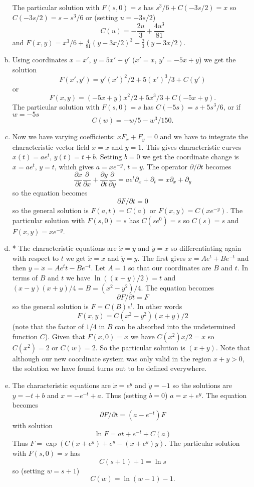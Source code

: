 \documentclass[12pt]{article}
\begin{document}
\begin{answer}
\begin{enumerate}[(a)]
The particular solution with $F(s,0)=s$ has $s^3/6+C(-3s/2)=x$ so $C(-3s/2)=s-s^3/6$ or (setting $u=-3s/2$)
\[C(u)=-\frac{2u}{3}+\frac{4u^3}{81}\]
and $F(x,y)=x^3/6+\frac{4}{81}(y-3x/2)^3-\frac{2}{3}(y-3x/2)$.
\item Using coordinates $x=x'$, $y=5x'+y'$ ($x'=x$, $y'=-5x+y$) we get the solution
\[F(x',y')=y'(x')^2/2+5(x')^3/3+C(y')\]
or
\[F(x,y)=(-5x+y)x^2/2+5x^3/3+C(-5x+y).\]
The particular solution with $F(s,0)=s$ has $C(-5s)=s+5s^3/6$, or if $w=-5s$
\[C(w)=-w/5-w^3/150.\]
\item Now we have varying coefficients: $xF_x+F_y=0$ and we have to integrate the characteristic vector field $\dot{x}=x$ and $\dot{y}=1$. This gives characteristic curves $x(t)=ae^t$, $y(t)=t+b$. Setting $b=0$ we get the coordinate change is $x=ae^t$, $y=t$, which gives $a=xe^{-y}$, $t=y$. The operator $\partial/\partial t$ becomes
\[\frac{\partial x}{\partial t}\frac{\partial}{\partial x}+\frac{\partial y}{\partial t}\frac{\partial}{\partial y}=ae^t\partial_x+\partial_t=x\partial_x+\partial_y\]
so the equation becomes
\[\partial F/\partial t=0\]
so the general solution is $F(a,t)=C(a)$ or $F(x,y)=C(xe^{-y})$. The particular solution with $F(s,0)=s$ has $C(se^0)=s$ so $C(s)=s$ and $F(x,y)=xe^{-y}$.
\item * The characteristic equations are $\dot{x}=y$ and $\dot{y}=x$ so differentiating again with respect to $t$ we get $\ddot{x}=x$ and $\ddot{y}=y$. The first gives $x=Ae^t+Be^{-t}$ and then $y=\dot{x}=Ae^t t-Be^{-t}$.
Let $A=1$ so that our coordinates are $B$ and $t$. In terms of $B$ and $t$ we have $\ln((x+y)/2)=t$ and $(x-y)(x+y)/4=B=(x^2-y^2)/4$.
The equation becomes
\[\partial F/\partial t=F\]
so the general solution is $F=C(B)e^t$.
In other words
\[F(x,y)=C(x^2-y^2)(x+y)/2\]
(note that the factor of $1/4$ in $B$ can be absorbed into the undetermined function $C$). Given that $F(x,0)=x$ we have $C(x^2)x/2=x$ so $C(x^2)=2$ or $C(w)=2$. So the particular solution is $(x+y)$.
Note that although our new coordinate system was only valid in the region $x+y>0$, the solution we have found turns out to be defined everywhere.
\item The characteristic equations are $\dot{x}=e^y$ and $\dot{y}=-1$ so the solutions are $y=-t+b$ and $x=-e^{-t}+a$. Thus (setting $b=0$) $a=x+e^{y}$. The equation becomes
\[\partial F/\partial t=(a-e^{-t})F\]
with solution
\[\ln F=at+e^{-t}+C(a)\]
Thus $F=\exp(C(x+e^{y})+e^y-(x+e^y)y)$. The particular solution with $F(s,0)=s$ has
\[C(s+1)+1=\ln s\]
so (setting $w=s+1$)
\[C(w)=\ln(w-1)-1.\]
\end{enumerate}
\end{answer}
\newpage
\fi
\end{document}
